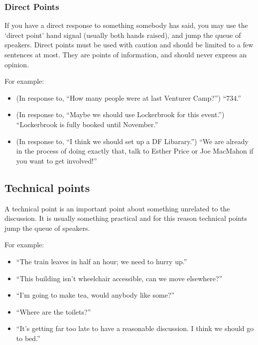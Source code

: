 \documentclass[a4paper, 11pt]{article} %
\begin{document}
\subsubsection{Direct Points}
If you have a direct response to something somebody has said, you may use the `direct point' hand signal (usually both hands raised), and jump the queue of speakers. Direct points must be used with caution and should be limited to a few sentences at most. They are points of information, and should never express an opinion.

For example:
\begin{itemize}
\item (In response to, ``How many people were at last Venturer Camp?'') ``734.''
\item (In response to, ``Maybe we should use Lockerbrook for this event.'') ``Lockerbrook is fully booked until November.''
\item (In response to, ``I think we should set up a DF Libarary.'') ``We are already in the process of doing exactly that, talk to Esther Price or Joe MacMahon if you want to get involved!''
\end{itemize}

\subsection{Technical points}
A technical point is an important point about something unrelated to the discussion.  It is usually something practical and for this reason technical points jump the queue of speakers.

For example:
\begin{itemize}
\item ``The train leaves in half an hour; we need to hurry up.''
\item ``This building isn't wheelchair accessible, can we move elsewhere?''
\item ``I'm going to make tea, would anybody like some?''
\item ``Where are the toilets?''
\item ``It's getting far too late to have a reasonable discussion.  I think we should go to bed.''
\end{itemize}
\end{document}
